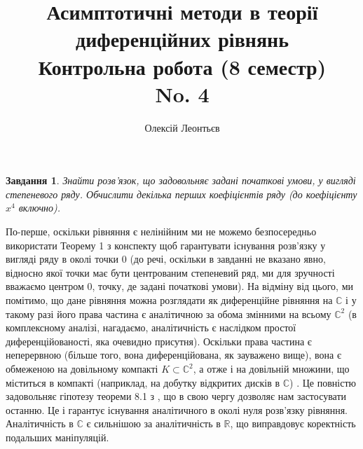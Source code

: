 \documentclass[12pt]{article} %
\title{
Асимптотичні методи в теорії диференційних рівнянь\\
Контрольна робота (8 семестр)\\
No. 4}
\author{Олексій Леонтьєв}
\newtheorem{prob}{Завдання}
\begin{document}
\maketitle
\begin{prob}Знайти розв’язок, що задовольняє задані початкові умови, у вигляді степеневого ряду. Обчислити декілька перших
коефіцієнтів ряду (до коефіцієнту $x^4$ включно).\end{prob}
По-перше, оскільки рівняння є нелінійним ми не можемо безпосередньо використати Теорему 1 з конспекту щоб гарантувати існування розв’язку у вигляді
ряду в околі точки 0 (до речі, оскільки в завданні не вказано явно, відносно якої точки має бути центрованим степеневий ряд, ми для зручності
вважаємо центром 0, точку, де задані початкові умови). На відміну від цього, ми помітимо, що дане рівняння можна розглядати як диференційне рівняння
на $\mathbb{C}$ і у такому разі його права частина є аналітичною за обома змінними на всьому $\mathbb{C}^2$ (в комплексному аналізі, нагадаємо,
аналітичність є наслідком простої диференційованості, яка очевидно присутня). Оскільки права частина є неперервною (більше того, вона
диференційована, як зауважено вище), вона є обмеженою на довільному компакті $K\subset\mathbb{C}^2$, а отже і на довільній множини, що міститься в
компакті (наприклад, на добутку відкритих дисків в $\mathbb{C}$)
. Це повністю задовольняє гіпотезу теореми 8.1 з \cite{coddington
}, що в свою чергу дозволяє нам застосувати останню. Це і гарантує існування аналітичного
в околі нуля розв’язку рівняння. Аналітичність в $\mathbb{C}$ є сильнішою за аналітичність в $\mathbb{R}$, що виправдовує коректність подальших
маніпуляцій.
\end{document}

